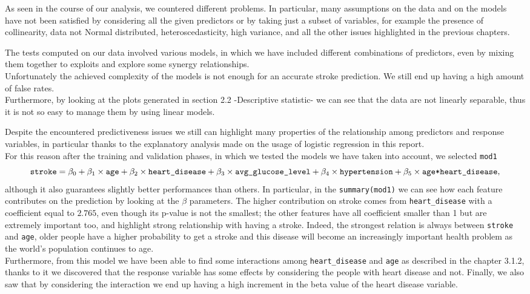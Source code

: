 \documentclass[
]{article}
\begin{document}
As seen in the course of our analysis, we countered different problems.
In particular, many assumptions on the data and on the models have not
been satisfied by considering all the given predictors or by taking just
a subset of variables, for example the presence of collinearity, data
not Normal distributed, heteroscedasticity, high variance, and all the
other issues highlighted in the previous chapters.

The tests computed on our data involved various models, in which we have
included different combinations of predictors, even by mixing them
together to exploits and explore some synergy relationships.\\
Unfortunately the achieved complexity of the models is not enough for an
accurate stroke prediction. We still end up having a high amount of
false rates.\\
Furthermore, by looking at the plots generated in section 2.2
-Descriptive statistic- we can see that the data are not linearly
separable, thus it is not so easy to manage them by using linear models.

Despite the encountered predictiveness issues we still can highlight
many properties of the relationship among predictors and response
variables, in particular thanks to the explanatory analysis made on the
usage of logistic regression in this report.\\
For this reason after the training and validation phases, in which we
tested the models we have taken into account, we selected \texttt{mod1}
\[\verb|stroke| = \beta_0 + \beta_1\times \verb|age| + \beta_2\times \verb|heart_disease| + \beta_3 \times  \verb|avg_glucose_level| + \beta_4 \times\verb|hypertension| + \beta_5 \times \verb|age*heart_disease|,\]
although it also guarantees slightly better performances than others. In
particular, in the \texttt{summary(mod1)} we can see how each feature
contributes on the prediction by looking at the \(\beta\) parameters.
The higher contribution on stroke comes from \texttt{heart\_disease}
with a coefficient equal to \(2.765\), even though its p-value is not
the smallest; the other features have all coefficient smaller than 1 but
are extremely important too, and highlight strong relationship with
having a stroke. Indeed, the strongest relation is always between
\texttt{stroke} and \texttt{age}, older people have a higher probability
to get a stroke and this disease will become an increasingly important
health problem as the world's population continues to age.\\
Furthermore, from this model we have been able to find some interactions
among \texttt{heart\_disease} and \texttt{age} as described in the
chapter 3.1.2, thanks to it we discovered that the response variable has
some effects by considering the people with heart disease and not.
Finally, we also saw that by considering the interaction we end up
having a high increment in the beta value of the heart disease variable.
\end{document}

